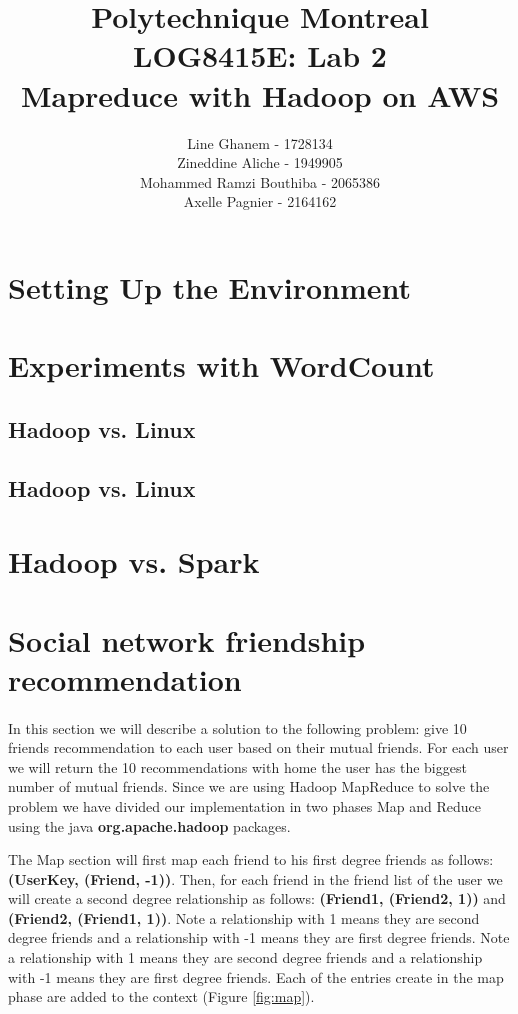 \documentclass[12pt]{article}
\title{Polytechnique Montreal \\
LOG8415E: Lab 2\\
Mapreduce with Hadoop on AWS}
\author{Line Ghanem - 1728134\\Zineddine Aliche - 1949905\\
Mohammed Ramzi Bouthiba - 2065386\\Axelle Pagnier - 2164162}
\begin{document}
\maketitle

\begin{abstract}

\end{abstract}

\section{Setting Up the Environment}


\section{Experiments with WordCount}
\subsection{Hadoop vs. Linux}

 
\subsection{Hadoop vs. Linux}
\section{Hadoop vs. Spark}


\section{Social network friendship recommendation}


\paragraph{}
In this section we will describe a solution to the following problem:
give 10 friends recommendation to each user based on their mutual friends.
For each user we will return the 10 recommendations with home the user has the biggest number of mutual friends. Since we are using Hadoop MapReduce to solve the problem we have divided our implementation in two phases Map and Reduce using the java \textbf{org.apache.hadoop} packages.

The Map section will first map each friend to his first degree friends as follows: \textbf{(UserKey, (Friend, -1))}.
Then, for each friend in the friend list of the user we will create a second degree relationship as follows: \textbf{(Friend1, (Friend2, 1))} and \textbf{(Friend2, (Friend1, 1))}. Note a relationship with 1 means they are second degree friends and a relationship with -1 means they are first degree friends. Note a relationship with 1 means they are second degree friends and a relationship with -1 means they are first degree friends. Each of the entries create in the map phase are added to the context (Figure \ref{fig:map}).
\end{document}
